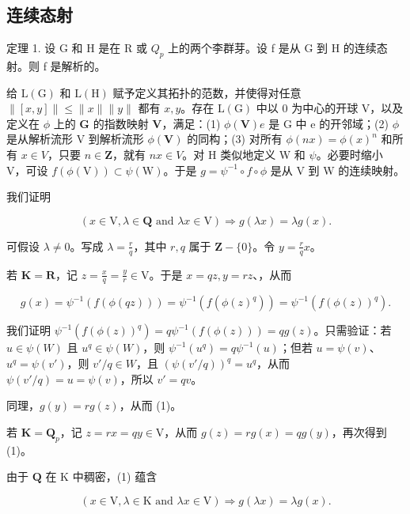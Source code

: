 \subsection{连续态射}

定理 1. 设 G 和 H 是在 R 或 \(Q_{p}\) 上的两个李群芽。设 f 是从 G 到 H 的连续态射。则 f 是解析的。

给 \(\mathrm{L}(\mathrm{G})\) 和 \(\mathrm{L}(\mathrm{H})\) 赋予定义其拓扑的范数，并使得对任意 \(\| [x,y]\| \leqslant \| x\| \| y\|\) 都有 \(x,y\)。存在 \(\mathrm{L}(\mathrm{G})\) 中以 0 为中心的开球 V，以及定义在 \(\phi\) 上的 \(\mathbf{G}\) 的指数映射 \(\mathbf{V}\)，满足：(1) \(\phi (\mathbf{V})\)\(e\) 是 G 中 e 的开邻域；(2) \(\phi\) 是从解析流形 V 到解析流形 \(\phi (\mathbf{V})\) 的同构；(3) 对所有 \(\phi (nx) = \phi (x)^n\) 和所有 \(x\in V\)，只要 \(n\in \mathbf{Z}\)，就有 \(nx\in V\)。对 H 类似地定义 W 和 \(\psi\)。必要时缩小 V，可设 \(f(\phi (\mathrm{V}))\subset \psi (\mathrm{W})\)。于是 \(g = \psi^{-1}\circ f\circ \phi\) 是从 V 到 W 的连续映射。

我们证明

\[
(x \in \mathrm{V}, \lambda \in \mathbf {Q} \text {   and   } \lambda x \in \mathrm{V}) \Rightarrow g (\lambda x) = \lambda g (x).\tag{1}
\]

可假设 \(\lambda \neq 0\)。写成 \(\lambda = \frac{r}{q}\)，其中 \(r, q\) 属于 \(\mathbf{Z} - \{0\}\)。令 \(y = \frac{r}{q} x\)。

若 \(\mathbf{K} = \mathbf{R}\)，记 \(z = \frac{x}{q} = \frac{y}{r} \in \mathrm{V}\)。于是 \(x = qz, y = rz\)、，从而

\[
g (x) = \psi^ {- 1} (f (\phi (q z))) = \psi^ {- 1} (f (\phi (z) ^ {q})) = \psi^ {- 1} (f (\phi (z)) ^ {q}).
\]

我们证明 \(\psi^{-1}(f(\phi(z))^q) = q\psi^{-1}(f(\phi(z))) = qg(z)\)。只需验证：若 \(u \in \psi(W)\) 且 \(u^q \in \psi(W)\)，则 \(\psi^{-1}(u^q) = q\psi^{-1}(u)\)；但若 \(u = \psi(v)\)、\(u^q = \psi(v')\)，则 \(v'/q \in W\)，且 \((\psi(v'/q))^q = u^q\)，从而 \(\psi(v'/q) = u = \psi(v)\)，所以 \(v' = qv\)。

同理，\(g(y) = rg(z)\)，从而 (1)。

若 \(\mathbf{K} = \mathbf{Q}_p\)，记 \(z = rx = qy \in \mathrm{V}\)，从而 \(g(z) = rg(x) = qg(y)\)，再次得到 (1)。

由于 \(\mathbf{Q}\) 在 K 中稠密，(1) 蕴含

\[
(x \in \mathrm{V}, \lambda \in \mathrm{K} \text {   and   } \lambda x \in \mathrm{V}) \Rightarrow g (\lambda x) = \lambda g (x).\tag{2}
\]


